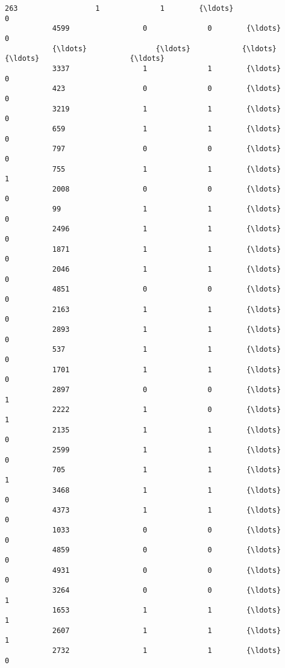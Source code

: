 \documentclass[11pt]{article}
\begin{document}
\begin{Verbatim}[commandchars=\\\{\}]
           263                  1              1        {\ldots}                       0   
           4599                 0              0        {\ldots}                       0   
           {\ldots}                {\ldots}            {\ldots}        {\ldots}                     {\ldots}   
           3337                 1              1        {\ldots}                       0   
           423                  0              0        {\ldots}                       0   
           3219                 1              1        {\ldots}                       0   
           659                  1              1        {\ldots}                       0   
           797                  0              0        {\ldots}                       0   
           755                  1              1        {\ldots}                       1   
           2008                 0              0        {\ldots}                       0   
           99                   1              1        {\ldots}                       0   
           2496                 1              1        {\ldots}                       0   
           1871                 1              1        {\ldots}                       0   
           2046                 1              1        {\ldots}                       0   
           4851                 0              0        {\ldots}                       0   
           2163                 1              1        {\ldots}                       0   
           2893                 1              1        {\ldots}                       0   
           537                  1              1        {\ldots}                       0   
           1701                 1              1        {\ldots}                       0   
           2897                 0              0        {\ldots}                       1   
           2222                 1              0        {\ldots}                       1   
           2135                 1              1        {\ldots}                       0   
           2599                 1              1        {\ldots}                       0   
           705                  1              1        {\ldots}                       1   
           3468                 1              1        {\ldots}                       0   
           4373                 1              1        {\ldots}                       0   
           1033                 0              0        {\ldots}                       0   
           4859                 0              0        {\ldots}                       0   
           4931                 0              0        {\ldots}                       0   
           3264                 0              0        {\ldots}                       1   
           1653                 1              1        {\ldots}                       1   
           2607                 1              1        {\ldots}                       1   
           2732                 1              1        {\ldots}                       0   
           

\end{Verbatim}
\end{document}

